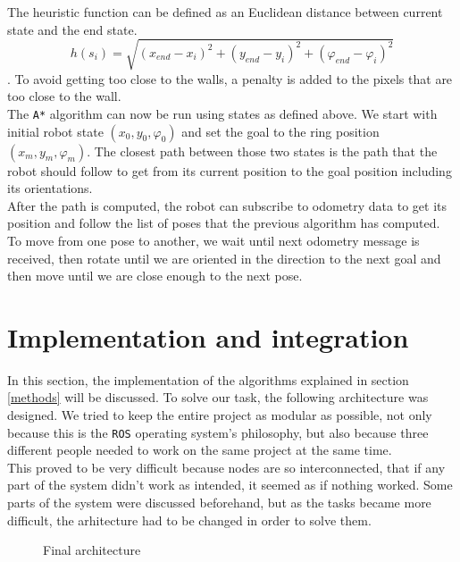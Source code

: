 \documentclass[12pt,a4paper]{article}
\begin{document}
	The heuristic function can be defined as an Euclidean distance between current state and the end state. $$h(s_i) = \sqrt{(x_{end} - x_i)^2 + (y_{end} - y_i)^2 + (\varphi_{end} - \varphi_i)^2}$$. To avoid getting too close to the walls, a penalty is added to the pixels that are too close to the wall. \\
	
	The \texttt{A*} algorithm can now be run using states as defined above. We start with initial robot state $(x_0, y_0, \varphi_0)$ and set the goal to the ring position $(x_m, y_m, \varphi_m)$. The closest path between those two states is the path that the robot should follow to get from its current position to the goal position including its orientations. \\
	
	After the path is computed, the robot can subscribe to odometry data to get its position and follow the list of poses that the previous algorithm has computed. To move from one pose to another, we wait until next odometry message is received, then rotate until we are oriented in the direction to the next goal and then move until we are close enough to the next pose. \\
	
	\section{Implementation and integration}
	In this section, the implementation of the algorithms explained in section \ref{methods} will be discussed. To solve our task, the following architecture was designed. We tried to keep the entire project as modular as possible, not only because this is the \texttt{ROS} operating system's philosophy, but also because three different people needed to work on the same project at the same time. \\ %
	
	This proved to be very difficult because nodes are so interconnected, that if any part of the system didn't work as intended, it seemed as if nothing worked. Some parts of the system were discussed beforehand, but as the tasks became more difficult, the arhitecture had to be changed in order to solve them. \\ 
	
	\begin{figure}[h]
		\centering
		\caption{Final architecture}
		\label{fig:final_architecture}
	\end{figure}
	
\end{document}
